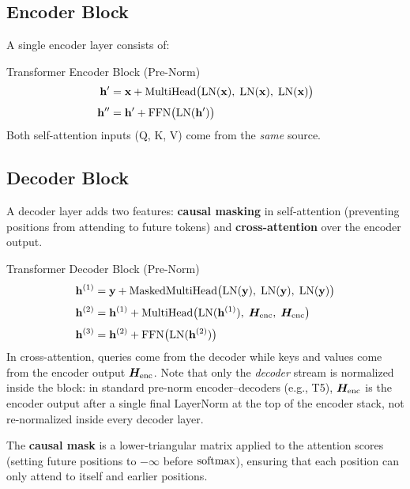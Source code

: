 \subsection{Encoder Block}

A single encoder layer consists of:

\begin{mathresult}{Transformer Encoder Block (Pre-Norm)}
\begin{align*}
    \mathbf{h}' &= \mathbf{x} + \text{MultiHead}\bigl(\text{LN}(\mathbf{x}),\; \text{LN}(\mathbf{x}),\; \text{LN}(\mathbf{x})\bigr) \\[3pt]
    \mathbf{h}'' &= \mathbf{h}' + \text{FFN}\bigl(\text{LN}(\mathbf{h}')\bigr)
\end{align*}
Both self-attention inputs (Q, K, V) come from the \emph{same} source.
\end{mathresult}

\subsection{Decoder Block}

A decoder layer adds two features: \textbf{causal masking} in self-attention
(preventing positions from attending to future tokens) and \textbf{cross-attention}
over the encoder output.

\begin{mathresult}{Transformer Decoder Block (Pre-Norm)}
\begin{align*}
    \mathbf{h}^{(1)} &= \mathbf{y} + \text{MaskedMultiHead}\bigl(\text{LN}(\mathbf{y}),\; \text{LN}(\mathbf{y}),\; \text{LN}(\mathbf{y})\bigr) \\[3pt]
    \mathbf{h}^{(2)} &= \mathbf{h}^{(1)} + \text{MultiHead}\bigl(\text{LN}(\mathbf{h}^{(1)}),\; \bm{H}_{\text{enc}},\; \bm{H}_{\text{enc}}\bigr) \\[3pt]
    \mathbf{h}^{(3)} &= \mathbf{h}^{(2)} + \text{FFN}\bigl(\text{LN}(\mathbf{h}^{(2)})\bigr)
\end{align*}
In cross-attention, queries come from the decoder while keys and values come
from the encoder output $\bm{H}_{\text{enc}}$.  Note that only the
\emph{decoder} stream is normalized inside the block: in standard pre-norm
encoder--decoders (e.g., T5), $\bm{H}_{\text{enc}}$ is the encoder output after
a single final LayerNorm at the top of the encoder stack, not re-normalized
inside every decoder layer.
\end{mathresult}

The \textbf{causal mask} is a lower-triangular matrix applied to the attention
scores (setting future positions to $-\infty$ before $\operatorname{softmax}$), ensuring that
each position can only attend to itself and earlier positions.


